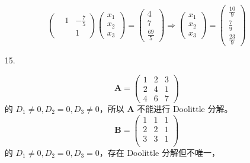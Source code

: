 \documentclass{sjtuarticle}
\begin{document}
\begin{itemize}
\begin{solution}
\begin{equation*}
\begin{pmatrix}
                & 1 & -\frac{7}{5}\\
                & & 1
            \end{pmatrix}\begin{pmatrix}
                x_1 \\
                x_2 \\
                x_3
            \end{pmatrix}=\begin{pmatrix}
                4 \\
                7 \\
                \frac{69}{5}
            \end{pmatrix}\Rightarrow
            \begin{pmatrix}
                x_1 \\
                x_2 \\
                x_3
            \end{pmatrix}=\begin{pmatrix}
                \frac{10}{9} \\
                \frac{7}{9} \\
                \frac{23}{9}
            \end{pmatrix}
        \end{equation*}
    \end{solution}
    \item[15.]\begin{solution}
        \begin{equation*}
            \bm{A}=\begin{pmatrix}
                1 & 2 & 3 \\
                2 & 4 & 1 \\
                4 & 6 & 7
            \end{pmatrix}
        \end{equation*}
        的 $D_1\neq 0, D_2=0, D_3\neq 0$，所以 $\bm{A}$ 不能进行 Doolittle 分解。
        \begin{equation*}
            \bm{B}=\begin{pmatrix}
                1 & 1 & 1 \\
                2 & 2 & 1 \\
                3 & 3 & 1 \\
            \end{pmatrix}
        \end{equation*}
        的 $D_1\neq 0,D_2 = 0,D_3=0$，存在 Doolittle 分解但不唯一， 
        \begin{equation*}

\end{equation*}
\end{solution}
\end{itemize}
\end{document}
